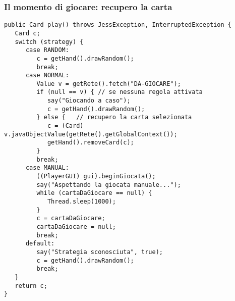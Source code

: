 \documentclass{beamer}
\begin{document}

\begin{frame}[fragile]
   \frametitle{Il momento di giocare: recupero la carta}
   \begin{lstlisting}
public Card play() throws JessException, InterruptedException {
   Card c;
   switch (strategy) {
      case RANDOM:
         c = getHand().drawRandom();
         break;
      case NORMAL:
         Value v = getRete().fetch("DA-GIOCARE");
         if (null == v) { // se nessuna regola attivata
            say("Giocando a caso");
            c = getHand().drawRandom();
         } else {	// recupero la carta selezionata
            c = (Card) v.javaObjectValue(getRete().getGlobalContext());
            getHand().removeCard(c);
         }
         break;
      case MANUAL:
         ((PlayerGUI) gui).beginGiocata();
         say("Aspettando la giocata manuale...");
         while (cartaDaGiocare == null) {
            Thread.sleep(1000);
         }
         c = cartaDaGiocare;
         cartaDaGiocare = null;
         break;
      default:
         say("Strategia sconosciuta", true);
         c = getHand().drawRandom();
         break;
   }
   return c;
}
   \end{lstlisting}
   
\end{frame}

\end{document}
